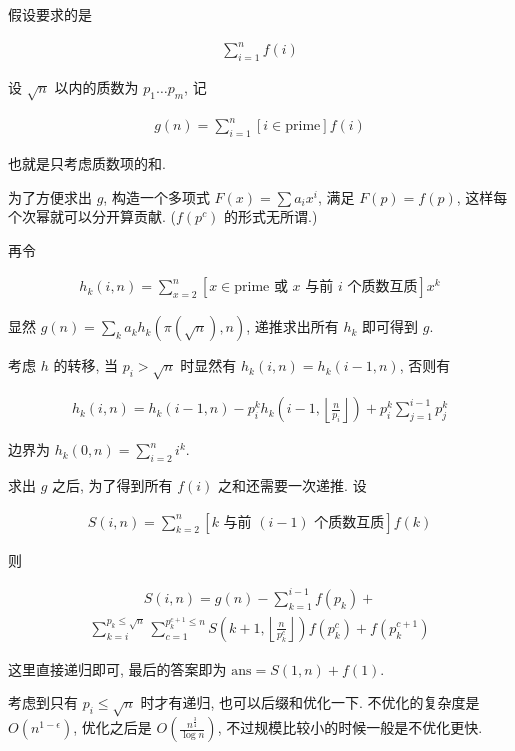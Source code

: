假设要求的是

$$ \begin{aligned} \sum_{i = 1} ^ n f(i) \end{aligned} $$

设 $\sqrt n$ 以内的质数为 $p_1 \dots p_m$, 记

$$ \begin{aligned} g(n) = \sum_{i = 1} ^ n \left[i \in \text{prime}\right] f(i) \end{aligned} $$

也就是只考虑质数项的和.

为了方便求出 $g$, 构造一个多项式 $F(x) = \sum a_i x^i$, 满足 $F(p) = f(p)$, 这样每个次幂就可以分开算贡献. ($f(p^c)$ 的形式无所谓.)

再令

$$ \begin{aligned} h_k(i, n) = \sum_{x = 2} ^ n \left[ x \in \text{prime 或 } x \text{ 与前 } i \text{ 个质数互质} \right] x^k \end{aligned} $$

显然 $g(n) = \sum_k a_k h_k\left( \pi\left(\sqrt n\right), n \right)$, 递推求出所有 $h_k$ 即可得到 $g$.

考虑 $h$ 的转移, 当 $p_i > \sqrt n$ 时显然有 $h_k(i, n) = h_k(i - 1, n)$, 否则有

$$ \begin{aligned} h_k(i, n) =  h_k(i - 1, n) - p_i ^ k h_k\left( i - 1, \left\lfloor \frac n {p_i} \right\rfloor \right) + p_i ^ k \sum_{j = 1} ^ {i - 1} p_j ^ k \end{aligned} $$

边界为 $h_k(0, n) = \sum_{i = 2} ^ n i^k$.

求出 $g$ 之后, 为了得到所有 $f(i)$ 之和还需要一次递推. 设

$$ \begin{aligned} S(i, n) = \sum_{k = 2} ^ n \left[ k \text{ 与前 } (i - 1) \text{ 个质数互质} \right] f(k) \end{aligned}$$

则

$$ \begin{aligned} S(i, n) = g(n) - \sum_{k = 1} ^ {i - 1} f(p_k) + \end{aligned} $$
$$ \begin{aligned} \sum_{k = i} ^ {p_k \le \sqrt n} \sum_{c = 1} ^ {p_k ^ {c + 1} \le n} S\left( k + 1, \left\lfloor \frac n {p_k ^ c} \right\rfloor \right) f\left( p_k ^ c \right) + f\left( p_k ^ {c + 1} \right) \end{aligned} $$

这里直接递归即可, 最后的答案即为 $\text{ans} = S(1, n) + f(1)$.

考虑到只有 $p_i \le \sqrt n$ 时才有递归, 也可以后缀和优化一下. 不优化的复杂度是 $O(n^{1 - \epsilon})$, 优化之后是 $O\left( \frac {n^{\frac 3 4}} {\log n} \right)$, 不过规模比较小的时候一般是不优化更快.